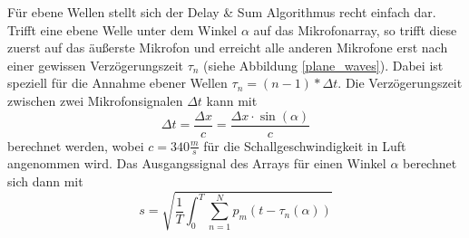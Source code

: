 	Für ebene Wellen stellt sich der Delay \& Sum Algorithmus recht einfach dar. Trifft eine ebene Welle unter dem Winkel $\alpha$ auf das Mikrofonarray, so trifft diese zuerst auf das äußerste Mikrofon und erreicht alle anderen Mikrofone erst nach einer gewissen Verzögerungszeit $\tau_n$ (siehe Abbildung \ref{plane_waves}).
	Dabei ist speziell für die Annahme ebener Wellen $\tau_n = (n - 1) * \Delta t$. Die Verzögerungszeit zwischen zwei Mikrofonsignalen $\Delta t$ kann mit 
	\begin{equation}
		\Delta t = \frac{\Delta x}{c} = \frac{\Delta x \cdot \sin(\alpha)}{c}
	\end{equation}
	berechnet werden, wobei $c = 340 \frac{m}{s}$ für die Schallgeschwindigkeit in Luft angenommen wird.
	Das Ausgangssignal des Arrays für einen Winkel $\alpha$ berechnet sich dann mit
	\begin{equation}
		s = \sqrt{\frac{1}{T} \int_{0}^{T} \sum_{n=1}^{N} p_m(t - \tau_n(\alpha))}
		\label{eq:das_plane}
	\end{equation}